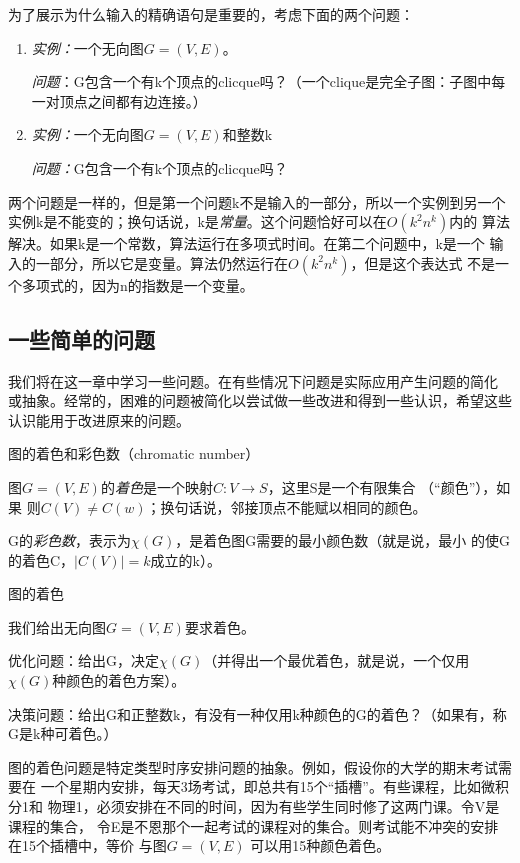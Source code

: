 为了展示为什么输入的精确语句是重要的，考虑下面的两个问题：
\begin{enumerate}
\item \emph{实例：}一个无向图$G=(V, E)$。

      \emph{问题}：G包含一个有k个顶点的clicque吗？（一个clique是完全子图：子图中每一对顶点之间都有边连接。）
\item \emph{实例：}一个无向图$G=(V, E)$和整数k

      \emph{问题：}G包含一个有k个顶点的clicque吗？
\end{enumerate}

两个问题是一样的，但是第一个问题k不是输入的一部分，所以一个实例到另一个
实例k是不能变的；换句话说，k是\emph{常量}。这个问题恰好可以在$O(k^2n^k)$内的
算法解决。如果k是一个常数，算法运行在多项式时间。在第二个问题中，k是一个
输入的一部分，所以它是变量。算法仍然运行在$O(k^2n^k)$，但是这个表达式
不是一个多项式的，因为n的指数是一个变量。

\subsection{一些简单的问题}
我们将在这一章中学习一些问题。在有些情况下问题是实际应用产生问题的简化
或抽象。经常的，困难的问题被简化以尝试做一些改进和得到一些认识，希望这些
认识能用于改进原来的问题。
\begin{definition}
图的着色和彩色数（chromatic number）

图$G=(V, E)$的\emph{着色}是一个映射$C: V \rightarrow S$，这里S是一个有限集合
（“颜色”），如果 则$C(V)\neq C(w)$；换句话说，邻接顶点不能赋以相同的颜色。

G的\emph{彩色数}，表示为$\chi(G)$，是着色图G需要的最小颜色数（就是说，最小
的使G的着色C，$|C(V)|=k$成立的k）。
\end{definition}

\begin{problem}
图的着色

我们给出无向图$G= (V, E)$要求着色。

优化问题：给出G，决定$\chi(G)$（并得出一个最优着色，就是说，一个仅用$\chi(G)$种颜色的着色方案）。

决策问题：给出G和正整数k，有没有一种仅用k种颜色的G的着色？（如果有，称G是k种可着色。）

图的着色问题是特定类型时序安排问题的抽象。例如，假设你的大学的期末考试需要在
一个星期内安排，每天3场考试，即总共有15个“插槽”。有些课程，比如微积分1和
物理1，必须安排在不同的时间，因为有些学生同时修了这两门课。令V是课程的集合，
令E是不恩那个一起考试的课程对的集合。则考试能不冲突的安排在15个插槽中，等价
与图$G=(V ,E)$ 可以用15种颜色着色。
\end{problem}


